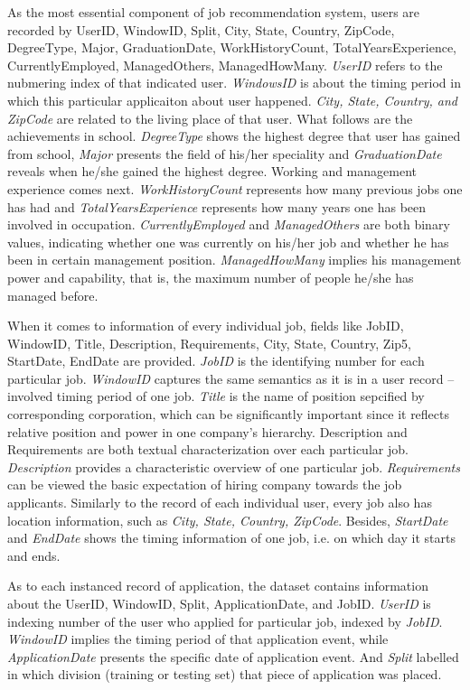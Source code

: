 \documentclass{article} %
\begin{document}
As the most essential component of job recommendation system, users are
recorded by UserID, WindowID, Split, City, State, Country, ZipCode,
DegreeType, Major, GraduationDate, WorkHistoryCount,
TotalYearsExperience, CurrentlyEmployed, ManagedOthers, ManagedHowMany.
{\it UserID} refers to the nubmering index of that indicated user.  
{\it WindowsID} is about the timing period in which this particular
applicaiton about user happened. 
{\it City, State, Country, and ZipCode} are related to the living place of
that user. 
What follows are the achievements in school. 
{\it DegreeType} shows the highest degree that user has gained from school,
{\it Major} presents the field of his/her speciality and 
{\it GraduationDate} reveals when he/she gained the highest degree.
Working and management experience comes next.
{\it WorkHistoryCount} represents how many previous jobs one has had and
{\it TotalYearsExperience} represents how many years one has been involved in
occupation. 
{\it CurrentlyEmployed} and {\it ManagedOthers} are both binary values,
indicating whether one was currently on his/her job and whether he has been in
certain management position. 
{\it ManagedHowMany} implies his management power and capability, that is, the maximum number
of people he/she has managed before.

When it comes to information of every individual job, fields like JobID,
WindowID, Title, Description, Requirements, City, State, Country, Zip5,
StartDate, EndDate are provided.
{\it JobID} is the identifying number for each particular job. 
{\it WindowID} captures the same semantics as it is in a user record --
involved timing period of one job.
{\it Title} is the name of position sepcified by corresponding corporation, which
can be significantly important since it reflects relative position and power
in one company's hierarchy. 
Description and Requirements are both textual characterization
over each particular job. 
{\it Description} provides a
characteristic overview of one particular job. 
{\it Requirements} can be
viewed the basic expectation of hiring company towards the job applicants.
Similarly to the record of each individual user, every job also has location
information, such as {\it City, State, Country, ZipCode}. 
Besides, {\it StartDate} and {\it EndDate} shows the timing information of one job,
i.e. on which day it starts and ends. 

As to each instanced record of application, the dataset contains information
about the UserID, WindowID, Split, ApplicationDate, and JobID. 
{\it UserID} is indexing number of the user who applied for particular job,
indexed by {\it JobID}. 
{\it WindowID} implies the timing period of that application event, while
{\it ApplicationDate} presents the specific date of application event. 
And {\it Split} labelled in which division (training or testing set) that
piece of application was placed.
\end{document}
